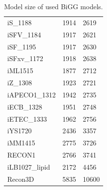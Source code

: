 \begin{table}[!ht]
\begin{tabular}{lll}
        iS\_1188 & 1914 & 2619 \\ 
        iSFV\_1184 & 1917 & 2621 \\ 
        iSF\_1195 & 1917 & 2630 \\ 
        iSFxv\_1172 & 1918 & 2638 \\ 
        iML1515 & 1877 & 2712 \\ 
        iZ\_1308 & 1923 & 2721 \\ 
        iAPECO1\_1312 & 1942 & 2735 \\ 
        iECB\_1328 & 1951 & 2748 \\ 
        iETEC\_1333 & 1962 & 2756 \\ 
        iYS1720 & 2436 & 3357 \\ 
        iMM1415 & 2775 & 3726 \\ 
        RECON1 & 2766 & 3741 \\ 
        iLB1027\_lipid & 2172 & 4456 \\ 
        Recon3D & 5835 & 10600 \\ \hline
    \end{tabular}
    \caption{\label{Tab:big_model_size} Model size of used BiGG models.}
\end{table}
